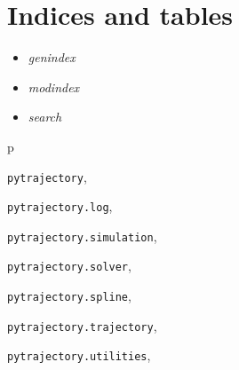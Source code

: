 \documentclass[letterpaper,10pt,english]{sphinxmanual}
\begin{document}
\chapter{Indices and tables}
\label{index:indices-and-tables}\begin{itemize}
\item {} 
\emph{genindex}

\item {} 
\emph{modindex}

\item {} 
\emph{search}

\end{itemize}


\renewcommand{\indexname}{Python Module Index}
\begin{theindex}
\def\bigletter#1{{\Large\sffamily#1}\nopagebreak\vspace{1mm}}
\bigletter{p}
\item {\texttt{pytrajectory}}, \pageref{pytrajectory:module-pytrajectory}
\item {\texttt{pytrajectory.log}}, \pageref{pytrajectory:module-pytrajectory.log}
\item {\texttt{pytrajectory.simulation}}, \pageref{pytrajectory:module-pytrajectory.simulation}
\item {\texttt{pytrajectory.solver}}, \pageref{pytrajectory:module-pytrajectory.solver}
\item {\texttt{pytrajectory.spline}}, \pageref{pytrajectory:module-pytrajectory.spline}
\item {\texttt{pytrajectory.trajectory}}, \pageref{pytrajectory:module-pytrajectory.trajectory}
\item {\texttt{pytrajectory.utilities}}, \pageref{pytrajectory:module-pytrajectory.utilities}
\end{theindex}

\renewcommand{\indexname}{Index}
\printindex
\end{document}
